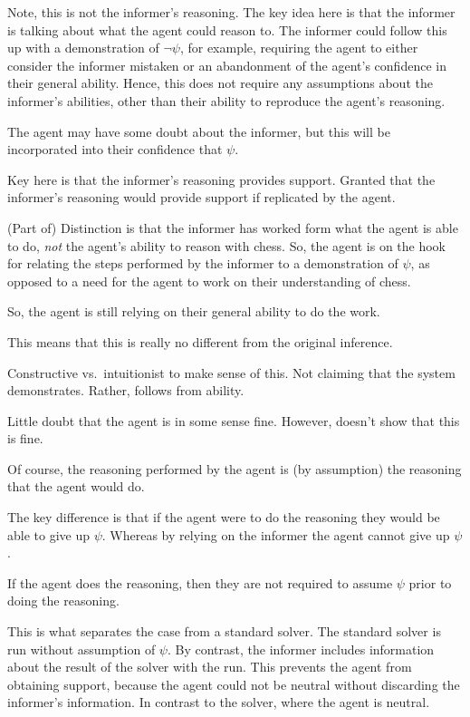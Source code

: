 \documentclass[10pt]{article}
\begin{document}
Note, this is not the informer's reasoning.
The key idea here is that the informer is talking about what the agent could reason to.
The informer could follow this up with a demonstration of \(\lnot\psi\), for example, requiring the agent to either consider the informer mistaken or an abandonment of the agent's confidence in their general ability.
Hence, this does not require any assumptions about the informer's abilities, other than their ability to reproduce the agent's reasoning.

The agent may have some doubt about the informer, but this will be incorporated into their confidence that \(\psi\).

Key here is that the informer's reasoning provides support.
Granted that the informer's reasoning would provide support if replicated by the agent.

(Part of) Distinction is that the informer has worked form what the agent is able to do, \emph{not} the agent's ability to reason with chess.
So, the agent is on the hook for relating the steps performed by the informer to a demonstration of \(\psi\), as opposed to a need for the agent to work on their understanding of chess.

So, the agent is still relying on their general ability to do the work.

This means that this is really no different from the original inference.


Constructive vs.\ intuitionist to make sense of this.
Not claiming that the system demonstrates.
Rather, follows from ability.

Little doubt that the agent is in some sense fine.
However, doesn't show that this is fine.

Of course, the reasoning performed by the agent is (by assumption) the reasoning that the agent would do.
{
  \color{red}
  The key difference is that if the agent were to do the reasoning they would be able to give up \(\psi\).
  Whereas by relying on the informer the agent cannot give up \(\psi\).

  If the agent does the reasoning, then they are not required to assume \(\psi\) prior to doing the reasoning.
}

This is what separates the case from a standard solver.
The standard solver is run without assumption of \(\psi\).
By contrast, the informer includes information about the result of the solver with the run.
This prevents the agent from obtaining support, because the agent could not be neutral without discarding the informer's information.
In contrast to the solver, where the agent is neutral.
\end{document}
